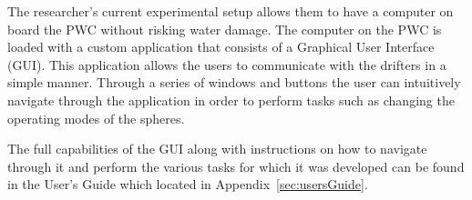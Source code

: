 
The researcher's current experimental setup allows them to have a computer on board the PWC without risking water damage.  The computer on the PWC is loaded with a custom application that consists of a Graphical User Interface (GUI).  This application allows the users to communicate with the drifters in a simple manner.   Through a series of windows and buttons the user can intuitively navigate through the application in order to perform tasks such as changing the operating modes of the spheres. 

The full capabilities of the GUI along with instructions on how to navigate through it and perform the various tasks for which it was developed can be found in the User's Guide which located in Appendix~\ref{sec:usersGuide}.  

